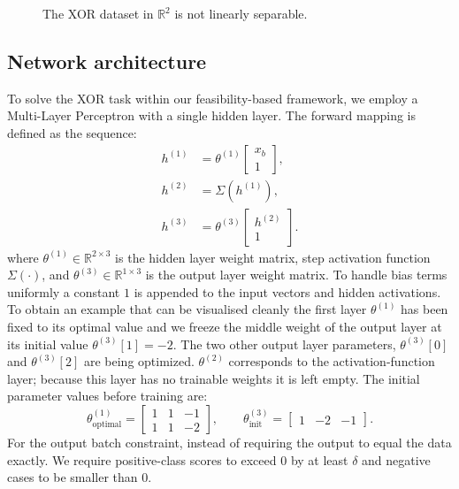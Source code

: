 \begin{figure}[ht]
\centering

\caption{The XOR dataset in $\mathbb{R}^2$ is not linearly separable.}
\label{fig:xor-problem}
\end{figure}
\subsection{Network architecture}
To solve the XOR task within our feasibility-based framework, we employ a Multi-Layer Perceptron with a single hidden layer.  The forward mapping is defined as the sequence:
\begin{align*}
    h^{(1)} &= \theta^{(1)} \begin{bmatrix} x_b \\ 1 \end{bmatrix}, \\
    h^{(2)} &= \Sigma(h^{(1)}), \\
    h^{(3)} &= \theta^{(3)} \begin{bmatrix} h^{(2)} \\ 1 \end{bmatrix}.
\end{align*}
where $\theta^{(1)} \in \mathbb{R}^{2 \times 3}$ is the hidden layer weight matrix, step activation function $\Sigma(\cdot)$, and $\theta^{(3)} \in \mathbb{R}^{1 \times 3}$ is the output layer weight matrix. To handle bias terms uniformly a constant $1$ is appended to the input vectors and hidden activations. 
To obtain an example that can be visualised cleanly the first layer $\theta^{(1)}$ has been fixed to its optimal value and we freeze the middle weight of the output layer at its initial value $\theta^{(3)}[1] = -2$. The two other output layer parameters, $\theta^{(3)}[0]$ and $\theta^{(3)}[2]$ are being optimized. $\theta^{(2)}$ corresponds to the activation-function layer; because this layer has no trainable weights it is left empty. The initial parameter values before training are:
\begin{equation*}
  \theta^{(1)}_{\mathrm{optimal}} =
\begin{bmatrix} 1 & 1 & -1 \\ 1 & 1 & -2 \end{bmatrix}, \qquad
\theta^{(3)}_{\mathrm{init}} =
\begin{bmatrix} 1 & -2 & -1 \end{bmatrix}.
\end{equation*}
 For the output batch constraint, instead of requiring the output to equal the data exactly. We require positive-class scores to exceed $0$ by at least $\delta$ and negative cases to be smaller than $0$. 

